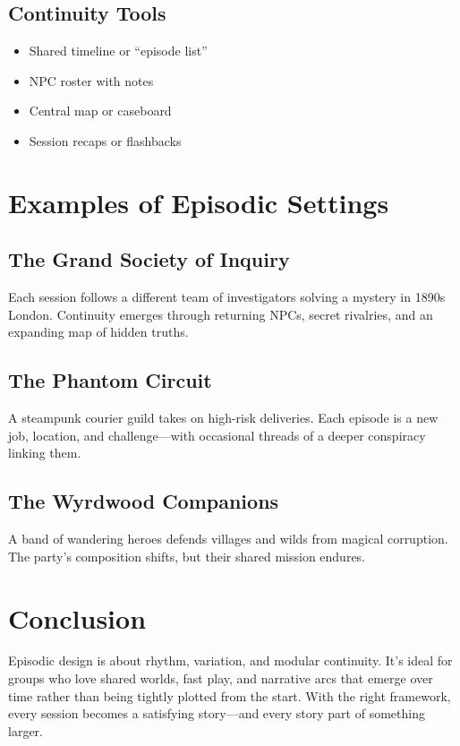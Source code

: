 \subsection*{Continuity Tools}
\begin{itemize}
    \item Shared timeline or “episode list”
    \item NPC roster with notes
    \item Central map or caseboard
    \item Session recaps or flashbacks
\end{itemize}

\section{Examples of Episodic Settings}

\subsection*{The Grand Society of Inquiry}
Each session follows a different team of investigators solving a mystery in 1890s London. Continuity emerges through returning NPCs, secret rivalries, and an expanding map of hidden truths.

\subsection*{The Phantom Circuit}
A steampunk courier guild takes on high-risk deliveries. Each episode is a new job, location, and challenge—with occasional threads of a deeper conspiracy linking them.

\subsection*{The Wyrdwood Companions}
A band of wandering heroes defends villages and wilds from magical corruption. The party’s composition shifts, but their shared mission endures.

\section{Conclusion}

Episodic design is about rhythm, variation, and modular continuity. It’s ideal for groups who love shared worlds, fast play, and narrative arcs that emerge over time rather than being tightly plotted from the start. With the right framework, every session becomes a satisfying story—and every story part of something larger.